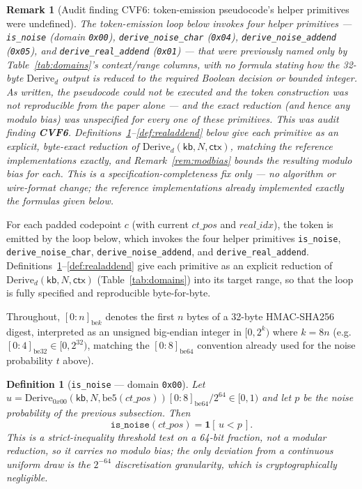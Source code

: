 \documentclass[11pt,a4paper]{article}
\newtheorem{definition}[theorem]{Definition}
\newtheorem{remark}[theorem]{Remark}
\begin{document}
\begin{remark}[Audit finding CVF6: token-emission pseudocode's helper primitives were undefined]
\label{rem:cvf6}
The token-emission loop below invokes four helper primitives ---
\texttt{is\_noise} (domain \texttt{0x00}), \texttt{derive\_noise\_char}
(\texttt{0x04}), \texttt{derive\_noise\_addend} (\texttt{0x05}), and
\texttt{derive\_real\_addend} (\texttt{0x01}) --- that were previously named
only by Table~\ref{tab:domains}'s context/range columns, with no formula
stating how the 32-byte $\mathrm{Derive}_d$ output is reduced to the
required Boolean decision or bounded integer. As written, the pseudocode
could not be executed and the token construction was not reproducible from
the paper alone --- and the exact reduction (and hence any modulo bias) was
unspecified for every one of these primitives. This was audit finding
\textbf{CVF6}. Definitions~\ref{def:isnoise}--\ref{def:realaddend} below
give each primitive as an explicit, byte-exact reduction of
$\mathrm{Derive}_d(\mathsf{kb},N,\mathsf{ctx})$, matching the reference
implementations exactly, and Remark~\ref{rem:modbias} bounds the resulting
modulo bias for each. This is a specification-completeness fix only --- no
algorithm or wire-format change; the reference implementations already
implemented exactly the formulas given below.
\end{remark}

For each padded codepoint $c$ (with current $ct\_pos$ and $real\_idx$),
the token is emitted by the loop below, which invokes the four helper
primitives \texttt{is\_noise}, \texttt{derive\_noise\_char},
\texttt{derive\_noise\_addend}, and \texttt{derive\_real\_addend}.
Definitions~\ref{def:isnoise}--\ref{def:realaddend} give each primitive
as an explicit reduction of $\mathrm{Derive}_d(\mathsf{kb},N,\mathsf{ctx})$
(Table~\ref{tab:domains}) into its target range, so that the loop is
fully specified and reproducible byte-for-byte.

Throughout, $[0{:}n]_{\mathrm{be}k}$ denotes the first $n$ bytes of a
32-byte HMAC-SHA256 digest, interpreted as an unsigned big-endian integer
in $[0, 2^{k})$ where $k = 8n$ (e.g.\ $[0{:}4]_{\mathrm{be32}} \in
[0,2^{32})$, matching the $[0{:}8]_{\mathrm{be64}}$ convention already used
for the noise probability $t$ above).

\begin{definition}[\texttt{is\_noise} --- domain \texttt{0x00}]
\label{def:isnoise}
Let $u = \mathrm{Derive}_{0x00}(\mathsf{kb}, N, \mathrm{be5}(ct\_pos))[0{:}8]_{\mathrm{be64}} / 2^{64} \in [0,1)$
and let $p$ be the noise probability of the previous subsection. Then
\[
  \texttt{is\_noise}(ct\_pos) = \mathbf{1}[\,u < p\,].
\]
This is a strict-inequality threshold test on a 64-bit fraction, not a
modular reduction, so it carries no modulo bias; the only deviation from a
continuous uniform draw is the $2^{-64}$ discretisation granularity, which
is cryptographically negligible.
\end{definition}
\end{document}
